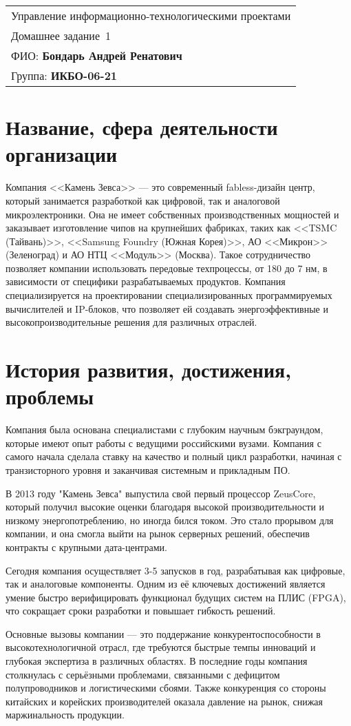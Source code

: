 \begin{tabular}{|l|}
	\hline
	Управление информационно-технологическими проектами \\
	Домашнее задание \No\,1 \\ \hline
	ФИО: \textbf{Бондарь Андрей Ренатович} \\ \hline
	Группа: \textbf{ИКБО-06-21} \\ \hline
\end{tabular}

\section{Название, сфера деятельности организации}

Компания <<Камень Зевса>> --- это современный fabless-дизайн центр,
который занимается разработкой как цифровой, так и аналоговой микроэлектроники.
Она не имеет собственных производственных мощностей
и заказывает изготовление чипов на крупнейших фабриках,
таких как <<TSMC (Тайвань)>>, <<Samsung Foundry (Южная Корея)>>,
АО <<Микрон>> (Зеленоград) и АО НТЦ <<Модуль>> (Москва).
Такое сотрудничество позволяет компании использовать передовые техпроцессы,
от 180 до 7 нм, в зависимости от специфики разрабатываемых продуктов.
Компания специализируется на проектировании специализированных
программируемых вычислителей и IP-блоков,
что позволяет ей создавать энергоэффективные
и высокопроизводительные решения для различных отраслей.

\section{История развития, достижения, проблемы}

Компания была основана специалистами с глубоким научным бэкграундом,
которые имеют опыт работы с ведущими российскими вузами.
Компания с самого начала сделала ставку на качество и полный цикл разработки,
начиная с транзисторного уровня и заканчивая системным и прикладным ПО.\par
В 2013 году "Камень Зевса" выпустила свой первый процессор ZeusCore,
который получил высокие оценки благодаря высокой производительности
и низкому энергопотреблению, но иногда бился током.
Это стало прорывом для компании,
и она смогла выйти на рынок серверных решений,
обеспечив контракты с крупными дата-центрами.\par
Сегодня компания осуществляет 3-5 запусков в год,
разрабатывая как цифровые, так и аналоговые компоненты.
Одним из её ключевых достижений является умение быстро верифицировать
функционал будущих систем на ПЛИС (FPGA),
что сокращает сроки разработки и повышает гибкость решений.\par
Основные вызовы компании --- это поддержание конкурентоспособности
в высокотехнологичной отрасл, где требуются быстрые темпы инноваций
и глубокая экспертиза в различных областях.
В последние годы компания столкнулась с серьёзными проблемами,
связанными с дефицитом полупроводников и логистическими сбоями.
Также конкуренция со стороны китайских
и корейских производителей оказала давление на рынок,
снижая маржинальность продукции.\par

